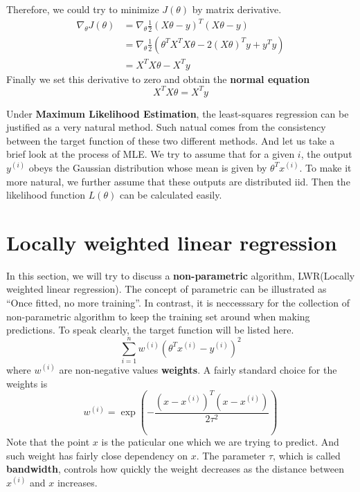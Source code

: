 Therefore, we could try to minimize $J(\theta)$ by matrix derivative.
\begin{align*}
    \nabla_\theta J(\theta) &= \nabla_\theta \frac{1}{2}(X\theta - y)^T(X\theta - y)\\
                            &= \nabla_\theta \frac{1}{2}(\theta^TX^TX\theta - 2(X\theta)^Ty + y^Ty)\\
                            &= X^TX\theta - X^Ty
\end{align*}
Finally we set this derivative to zero and obtain the \textbf{normal equation}
\begin{equation}
    \label{LR: normeq}
    X^TX\theta = X^Ty
\end{equation}

Under \textbf{Maximum Likelihood Estimation}, the least-squares regression can be justified as a very natural method. Such natual comes from the consistency between the target function of these
two different methods. And let us take a brief look at the process of MLE. We try to assume that for a given $i$, the output $y^{(i)}$ obeys the Gaussian distribution whose mean is given by
$\theta^Tx^{(i)}$. To make it more natural, we further assume that these outputs are distributed iid. Then the likelihood function $L(\theta)$ can be calculated easily.

\section{Locally weighted linear regression}

In this section, we will try to discuss a \textbf{non-parametric} algorithm, LWR(Locally weighted linear regression). The concept of parametric can be illustrated as ``Once fitted, no more training''.
In contrast, it is neccesssary for the collection of non-parametric algorithm to keep the training set around when making predictions. To speak clearly, the target function will be listed here.
\begin{equation}
    \label{LR: LWR}
    \sum_{i=1}^{n}w^{(i)}(\theta^Tx^{(i)}-y^{(i)})^2
\end{equation}
where $w^{(i)}$ are non-negative values \textbf{weights}. A fairly standard choice for the weights is 
\[w^{(i)}=\exp\left(-\frac{(x-x^{(i)})^T(x-x^{(i)})}{2\tau^2}\right)\]
Note that the point $x$ is the paticular one which we are trying to predict. And such weight has fairly close dependency on $x$. The parameter $\tau$, which is called \textbf{bandwidth}, controls
how quickly the weight decreases as the distance between $x^{(i)}$ and $x$ increases.

